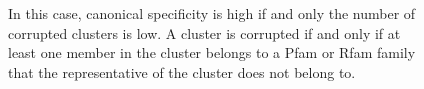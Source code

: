 \documentclass[11pt,letterpaper]{article}
\begin{document}
\begin{figure}
{	%
	In this case, canonical specificity is high if and only the number of corrupted clusters is low.
	A cluster is corrupted if and only if at least one member in the cluster belongs to a Pfam or Rfam family that the representative of the cluster does not belong to.
	\label{fig:pfam-appendix}
	}
\end{figure}












\iffalse
\end{document}
